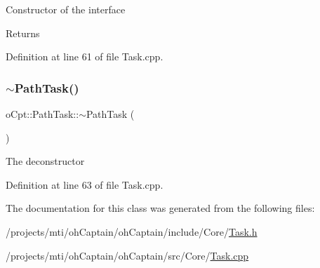 Constructor of the interface \begin{DoxyReturn}{Returns}

\end{DoxyReturn}


Definition at line 61 of file Task.\+cpp.

\hypertarget{classo_cpt_1_1_path_task_a957810982a8f94b7c0b942e348e86467}{}\label{classo_cpt_1_1_path_task_a957810982a8f94b7c0b942e348e86467} 
\subsubsection{\texorpdfstring{$\sim$\+Path\+Task()}{~PathTask()}}
{\footnotesize\ttfamily o\+Cpt\+::\+Path\+Task\+::$\sim$\+Path\+Task (\begin{DoxyParamCaption}{ }\end{DoxyParamCaption})\hspace{0.3cm}{\ttfamily [virtual]}}

The deconstructor 

Definition at line 63 of file Task.\+cpp.



The documentation for this class was generated from the following files\+:\begin{DoxyCompactItemize}
\item 
/projects/mti/oh\+Captain/oh\+Captain/include/\+Core/\hyperlink{_task_8h}{Task.\+h}\item 
/projects/mti/oh\+Captain/oh\+Captain/src/\+Core/\hyperlink{_task_8cpp}{Task.\+cpp}\end{DoxyCompactItemize}
